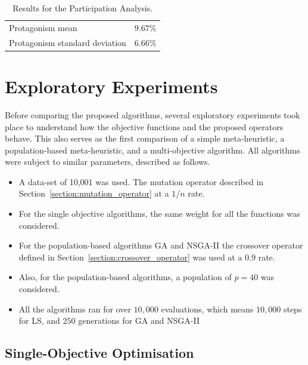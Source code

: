 \begin{table}[H]
    \centering
    \begin{tabular}{ll}
    \hline
    Protagonism mean               & $9.67\%$ \\
    Protagonism standard deviation & $6.66\%$ \\
    \hline
    \end{tabular}
    \caption{Results for the Participation Analysis.}
    \label{table:participation_results}
\end{table}

\section{Exploratory Experiments}

Before comparing the proposed algorithms, several exploratory experiments took place to understand how the objective functions and the proposed operators behave. This also serves as the first comparison of a simple meta-heuristic, a population-based meta-heuristic, and a multi-objective algorithm. All algorithms were subject to similar parameters, described as follows.\\

\begin{itemize}
    \item A data-set of {10,001} was used. The mutation operator described in 
    Section~\ref{section:mutation_operator} at a $1/n$ rate.

    \item For the single objective algorithms, the same weight for all the functions was considered.
    
    \item For the population-based algorithms GA and NSGA-II the crossover operator defined in Section~\ref{section:crossover_operator} was used at a $0.9$ rate.

    \item Also, for the population-based algorithms, a population of $p=40$ was considered. 
    
    \item All the algorithms ran for over $10,000$ evaluations, which means $10,000$ steps for LS, and $250$ generations for GA and NSGA-II
\end{itemize}

\subsection{Single-Objective Optimisation}

